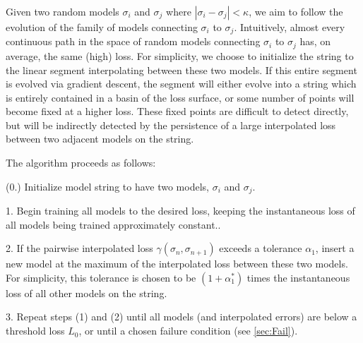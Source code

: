 \documentclass{article} %
\begin{document}
  Given two random models $\sigma_i$ and $\sigma_j$ where $|\sigma_i - \sigma_j| < \kappa$, we aim to follow the evolution of the family of models connecting $\sigma_i$ to $\sigma_j$.  Intuitively, almost every continuous path in the space of random models connecting $\sigma_i$ to $\sigma_j$ has, on average, the same (high) loss.  For simplicity, we choose to initialize the string to the linear segment interpolating between these two models.  If this entire segment is evolved via gradient descent, the segment will either evolve into a string which is entirely contained in a basin of the loss surface, or some number of points will become fixed at a higher loss.  These fixed points are difficult to detect directly, but will be indirectly detected by the persistence of a large interpolated loss between two adjacent models on the string.
  
  The algorithm proceeds as follows:
  
  (0.) Initialize model string to have two models, $\sigma_i$ and $\sigma_j$.
  
  1. Begin training all models to the desired loss, keeping the instantaneous loss of all models being trained approximately constant..
  
  2. If the pairwise interpolated loss $\gamma(\sigma_n,\sigma_{n+1})$ exceeds a tolerance $\alpha_1$, insert a new model at the maximum of the interpolated loss between these two models.  For simplicity, this tolerance is chosen to be $(1 + \alpha_1^*)$ times the instantaneous loss of all other models on the string.  
  
  3. Repeat steps (1) and (2) until all models (and interpolated errors) are below a threshold loss $L_0$, or until a chosen failure condition (see \ref{sec:Fail}).





\end{document}

